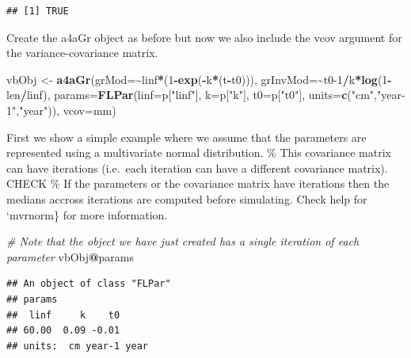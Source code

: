 \documentclass[
]{book}
\newenvironment{Shaded}{\begin{snugshade}}{\end{snugshade}}
\newcommand{\AttributeTok}[1]{\textcolor[rgb]{0.13,0.29,0.53}{#1}}
\newcommand{\CommentTok}[1]{\textcolor[rgb]{0.56,0.35,0.01}{\textit{#1}}}
\newcommand{\DecValTok}[1]{\textcolor[rgb]{0.00,0.00,0.81}{#1}}
\newcommand{\FunctionTok}[1]{\textcolor[rgb]{0.13,0.29,0.53}{\textbf{#1}}}
\newcommand{\NormalTok}[1]{#1}
\newcommand{\OtherTok}[1]{\textcolor[rgb]{0.56,0.35,0.01}{#1}}
\newcommand{\SpecialCharTok}[1]{\textcolor[rgb]{0.81,0.36,0.00}{\textbf{#1}}}
\newcommand{\StringTok}[1]{\textcolor[rgb]{0.31,0.60,0.02}{#1}}
\begin{document}
\begin{verbatim}
## [1] TRUE
\end{verbatim}

Create the a4aGr object as before but now we also include the vcov argument for the variance-covariance matrix.

\begin{Shaded}
\begin{Highlighting}[]
\NormalTok{vbObj }\OtherTok{\textless{}{-}} \FunctionTok{a4aGr}\NormalTok{(}\AttributeTok{grMod=}\SpecialCharTok{\textasciitilde{}}\NormalTok{linf}\SpecialCharTok{*}\NormalTok{(}\DecValTok{1}\SpecialCharTok{{-}}\FunctionTok{exp}\NormalTok{(}\SpecialCharTok{{-}}\NormalTok{k}\SpecialCharTok{*}\NormalTok{(t}\SpecialCharTok{{-}}\NormalTok{t0))), }\AttributeTok{grInvMod=}\SpecialCharTok{\textasciitilde{}}\NormalTok{t0}\DecValTok{{-}1}\SpecialCharTok{/}\NormalTok{k}\SpecialCharTok{*}\FunctionTok{log}\NormalTok{(}\DecValTok{1}\SpecialCharTok{{-}}\NormalTok{len}\SpecialCharTok{/}\NormalTok{linf), }
               \AttributeTok{params=}\FunctionTok{FLPar}\NormalTok{(}\AttributeTok{linf=}\NormalTok{p[}\StringTok{"linf"}\NormalTok{], }\AttributeTok{k=}\NormalTok{p[}\StringTok{"k"}\NormalTok{], }\AttributeTok{t0=}\NormalTok{p[}\StringTok{"t0"}\NormalTok{], }
                            \AttributeTok{units=}\FunctionTok{c}\NormalTok{(}\StringTok{"cm"}\NormalTok{,}\StringTok{"year{-}1"}\NormalTok{,}\StringTok{"year"}\NormalTok{)), }\AttributeTok{vcov=}\NormalTok{mm)}
\end{Highlighting}
\end{Shaded}

First we show a simple example where we assume that the parameters are represented using a multivariate normal distribution.
\% This covariance matrix can have iterations (i.e.~each iteration can have a different covariance matrix). CHECK
\% If the parameters or the covariance matrix have iterations then the medians accross iterations are computed before simulating. Check help for `mvrnorm\} for more information.

\begin{Shaded}
\begin{Highlighting}[]
\CommentTok{\# Note that the object we have just created has a single iteration of each parameter}
\NormalTok{vbObj}\SpecialCharTok{@}\NormalTok{params}
\end{Highlighting}
\end{Shaded}

\begin{verbatim}
## An object of class "FLPar"
## params
##  linf     k    t0 
## 60.00  0.09 -0.01 
## units:  cm year-1 year
\end{verbatim}
\end{document}
